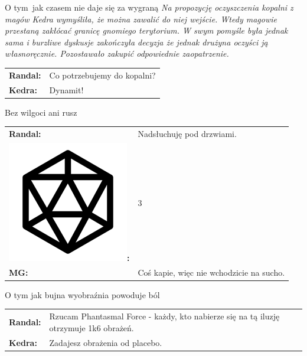 \documentclass[10pt,twoside,twocolumn]{book}
\begin{document}
\begin{rpg-quotebox}{O tym\, jak czasem nie daje się za wygraną}
\textit{Na propozycję oczyszczenia kopalni z magów Kedra wymyśliła, że można zawalić do niej wejście. Wtedy magowie przestaną zakłócać granicę gnomiego terytorium. W swym pomyśle była jednak sama i burzliwe dyskusje zakończyła decyzja że jednak drużyna oczyści ją własnoręcznie. Pozostawało zakupić odpowiednie zaopatrzenie.}\\

   \begin{tabularx}{\columnwidth}{lX}
      \textbf{Randal:} & Co potrzebujemy do kopalni?\\
      \textbf{Kedra:} & Dynamit!\\
   \end{tabularx}
\end{rpg-quotebox}

\begin{rpg-quotebox}{Bez wilgoci ani rusz}
   \begin{tabularx}{\columnwidth}{lX}
      \textbf{Randal:} & Nadsłuchuję pod drzwiami.\\
      \includegraphics[scale=0.06]{img/d20.png}\textbf{:}& 3\\
      \textbf{MG:} & Coś kapie, więc nie wchodzicie na sucho.\\
   \end{tabularx}
\end{rpg-quotebox}

\begin{rpg-quotebox}{O tym jak bujna wyobraźnia powoduje ból}
   \begin{tabularx}{\columnwidth}{lX}
      \textbf{Randal:} & Rzucam Phantasmal Force - każdy, kto nabierze się na tą iluzję otrzymuje 1k6 obrażeń.\\
      \textbf{Kedra:} & Zadajesz obrażenia od placebo.\\
   \end{tabularx}
\end{rpg-quotebox}
\end{document}
